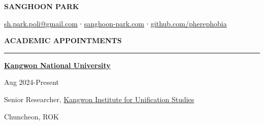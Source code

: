 \documentclass[
  16,
]{article}
\author{}
\date{}
\begin{document}
\begin{huge}\begin{center}{\bf SANGHOON PARK}\end{center}\end{huge}

\begin{center}
{\faEnvelope} \href{sh.park.poli@gmail.com}{\ttfamily sh.park.poli@gmail.com} ∙
{\faLink} \href{sanghoon-park.com}{\ttfamily sanghoon-park.com} ∙ 
{\faGithub} \href{https://github.com/pherephobia}{\ttfamily github.com/pherephobia}
\end{center}
\vspace{15pt}
\vspace{3pt}
\begin{large}
 {\bf ACADEMIC APPOINTMENTS}
  \vspace{3pt}
  \hrule
  \begin{minipage}[c]{0.6\textwidth}
    \begin{flushleft}{\href{https://wwwk.kangwon.ac.kr/english/index.do}{\bf Kangwon National University}}\end{flushleft}
  \end{minipage}
  \begin{minipage}[c]{0.39\textwidth}
    \begin{flushright}Aug 2024-Present\end{flushright}
  \end{minipage}
  \vspace{-0.17cm}
  \begin{minipage}[c]{0.6\textwidth}
    \begin{flushleft}Senior Researcher, \href{https://kius.kangwon.ac.kr/}{Kangwon Institute for Unification Studies}\end{flushleft}
  \end{minipage}
  \begin{minipage}[c]{0.39\textwidth}
    \begin{flushright}Chuncheon, ROK\end{flushright}
  \end{minipage}
  \vspace{-0.25cm}
\end{large}
\vspace{3pt}
\end{document}
